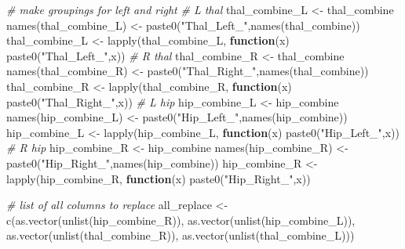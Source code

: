 \documentclass[
]{article}
\newenvironment{Shaded}{\begin{snugshade}}{\end{snugshade}}
\newcommand{\CommentTok}[1]{\textcolor[rgb]{0.56,0.35,0.01}{\textit{#1}}}
\newcommand{\ControlFlowTok}[1]{\textcolor[rgb]{0.13,0.29,0.53}{\textbf{#1}}}
\newcommand{\FunctionTok}[1]{\textcolor[rgb]{0.00,0.00,0.00}{#1}}
\newcommand{\NormalTok}[1]{#1}
\newcommand{\OtherTok}[1]{\textcolor[rgb]{0.56,0.35,0.01}{#1}}
\newcommand{\StringTok}[1]{\textcolor[rgb]{0.31,0.60,0.02}{#1}}
\begin{document}
\begin{Shaded}
\begin{Highlighting}[]
\CommentTok{\# make groupings for left and right}
\CommentTok{\# L thal}
\NormalTok{thal\_combine\_L }\OtherTok{\textless{}{-}}\NormalTok{  thal\_combine}
\FunctionTok{names}\NormalTok{(thal\_combine\_L) }\OtherTok{\textless{}{-}} \FunctionTok{paste0}\NormalTok{(}\StringTok{"Thal\_Left\_"}\NormalTok{,}\FunctionTok{names}\NormalTok{(thal\_combine))}
\NormalTok{thal\_combine\_L }\OtherTok{\textless{}{-}} \FunctionTok{lapply}\NormalTok{(thal\_combine\_L, }\ControlFlowTok{function}\NormalTok{(x) }\FunctionTok{paste0}\NormalTok{(}\StringTok{"Thal\_Left\_"}\NormalTok{,x))}
\CommentTok{\# R thal}
\NormalTok{thal\_combine\_R }\OtherTok{\textless{}{-}}\NormalTok{  thal\_combine}
\FunctionTok{names}\NormalTok{(thal\_combine\_R) }\OtherTok{\textless{}{-}} \FunctionTok{paste0}\NormalTok{(}\StringTok{"Thal\_Right\_"}\NormalTok{,}\FunctionTok{names}\NormalTok{(thal\_combine))}
\NormalTok{thal\_combine\_R }\OtherTok{\textless{}{-}} \FunctionTok{lapply}\NormalTok{(thal\_combine\_R, }\ControlFlowTok{function}\NormalTok{(x) }\FunctionTok{paste0}\NormalTok{(}\StringTok{"Thal\_Right\_"}\NormalTok{,x))}
\CommentTok{\# L hip}
\NormalTok{hip\_combine\_L }\OtherTok{\textless{}{-}}\NormalTok{  hip\_combine}
\FunctionTok{names}\NormalTok{(hip\_combine\_L) }\OtherTok{\textless{}{-}} \FunctionTok{paste0}\NormalTok{(}\StringTok{"Hip\_Left\_"}\NormalTok{,}\FunctionTok{names}\NormalTok{(hip\_combine))}
\NormalTok{hip\_combine\_L }\OtherTok{\textless{}{-}} \FunctionTok{lapply}\NormalTok{(hip\_combine\_L, }\ControlFlowTok{function}\NormalTok{(x) }\FunctionTok{paste0}\NormalTok{(}\StringTok{"Hip\_Left\_"}\NormalTok{,x))}
\CommentTok{\# R hip}
\NormalTok{hip\_combine\_R }\OtherTok{\textless{}{-}}\NormalTok{  hip\_combine}
\FunctionTok{names}\NormalTok{(hip\_combine\_R) }\OtherTok{\textless{}{-}} \FunctionTok{paste0}\NormalTok{(}\StringTok{"Hip\_Right\_"}\NormalTok{,}\FunctionTok{names}\NormalTok{(hip\_combine))}
\NormalTok{hip\_combine\_R }\OtherTok{\textless{}{-}} \FunctionTok{lapply}\NormalTok{(hip\_combine\_R, }\ControlFlowTok{function}\NormalTok{(x) }\FunctionTok{paste0}\NormalTok{(}\StringTok{"Hip\_Right\_"}\NormalTok{,x))}

\CommentTok{\# list of all columns to replace}
\NormalTok{all\_replace }\OtherTok{\textless{}{-}} \FunctionTok{c}\NormalTok{(}\FunctionTok{as.vector}\NormalTok{(}\FunctionTok{unlist}\NormalTok{(hip\_combine\_R)), }\FunctionTok{as.vector}\NormalTok{(}\FunctionTok{unlist}\NormalTok{(hip\_combine\_L)), }\FunctionTok{as.vector}\NormalTok{(}\FunctionTok{unlist}\NormalTok{(thal\_combine\_R)), }\FunctionTok{as.vector}\NormalTok{(}\FunctionTok{unlist}\NormalTok{(thal\_combine\_L)))}


\end{Highlighting}
\end{Shaded}
\end{document}
